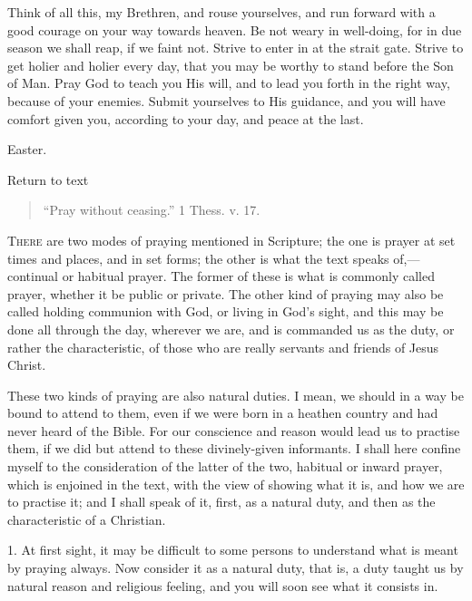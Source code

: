 Think of all this, my Brethren, and rouse yourselves,
and run forward with a good courage on your way towards
heaven. Be not weary in well-doing, for in due season we
shall reap, if we faint not. Strive to enter in at the
strait gate. Strive to get holier and holier every day,
that you may be worthy to stand before the Son of Man.
Pray God to teach you His will, and to lead you forth in
the right way, because of your enemies. Submit yourselves
to His guidance, and you will have comfort given you,
according to your day, and peace at the last.


Easter.

Return to text


\begin{quote}

``Pray without ceasing.'' 1 Thess. v. 17.

\end{quote}

T\textsc{here} are two modes of praying mentioned in Scripture; the one is
prayer at set times and places, and in set forms; the other is what
the text speaks of,—continual or habitual prayer. The former of
these is what is commonly called prayer, whether it be public or
private. The other kind of praying may also be called holding
communion with God, or living in God's sight, and this may be done all
through the day, wherever we are, and is commanded us as the duty, or
rather the characteristic, of those who are really servants and
friends of Jesus Christ.

These two kinds of praying are also natural duties. I mean, we
should in a way be bound to attend to them, even if we were born in a
heathen country and had never heard of the Bible. For our conscience
and reason would lead us to practise them, if we did but attend to
these divinely-given informants. I shall here confine myself to the
consideration of the latter of the two, habitual or inward prayer,
which is enjoined in the text, with the view of showing what it is,
and how we are to practise it; and I shall speak of it, first, as a
natural duty, and then as the characteristic of a Christian.

1. At first sight, it may be difficult to some persons to
understand what is meant by praying always. Now consider it as a
natural duty, that is, a duty taught us by natural reason and
religious feeling, and you will soon see what it consists in.

